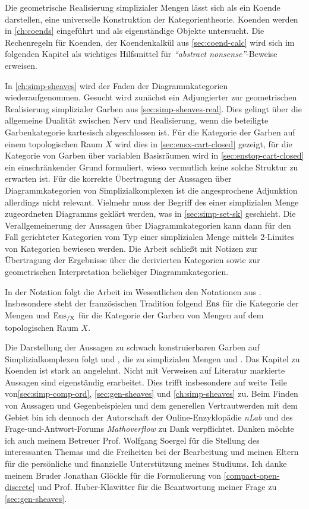 Die geometrische Realisierung simplizialer Mengen lässt sich als ein
Koende darstellen, eine universelle Konstruktion der
Kategorientheorie. Koenden werden in \autoref{ch:coends} eingeführt
und als eigenständige Objekte untersucht. Die Rechenregeln für
Koenden, der Koendenkalkül aus \autoref{sec:coend-calc} wird sich im
folgenden Kapitel als wichtiges Hilfsmittel für \emph{``abstract
  nonsense''}-Beweise erweisen.

In \autoref{ch:simp-sheaves} wird der Faden der Diagrammkategorien
wiederaufgenommen. Gesucht wird zunächst ein Adjungierter zur
geometrischen Realisierung simplizialer Garben aus
\autoref{sec:simp-sheaves-real}. Dies gelingt über die allgemeine
Dualität zwischen Nerv und Realisierung, wenn die beteiligte
Garbenkategorie kartesisch abgeschlossen ist.  Für die Kategorie der
Garben auf einem topologischen Raum $X$ wird dies in
\autoref{sec:ensx-cart-closed} gezeigt, für die Kategorie von Garben
über variablen Basisräumen wird in \autoref{sec:enstop-cart-closed}
ein einschränkender Grund formuliert, wieso vermutlich keine solche
Struktur zu erwarten ist. Für die korrekte Übertragung der Aussagen
über Diagrammkategorien von Simplizialkomplexen ist die angesprochene
Adjunktion allerdings nicht relevant. Vielmehr muss der Begriff des
einer simplizialen Menge zugeordneten Diagramms geklärt werden, was in
\autoref{sec:simp-set-sk} geschieht. Die Verallgemeinerung der
Aussagen über Diagrammkategorien kann dann für den Fall gerichteter
Kategorien vom Typ einer simplizialen Menge mittels 2-Limites von
Kategorien bewiesen werden. Die Arbeit schließt mit Notizen zur
Übertragung der Ergebnisse über die derivierten Kategorien sowie zur
geometrischen Interpretation beliebiger Diagrammkategorien.

In der Notation folgt die Arbeit im Wesentlichen den Notationen aus
\cite{TG}. Insbesondere steht der französischen Tradition folgend
$\operatorname{Ens}$ für die Kategorie der Mengen und $\operatorname{Ens_{/X}}$ für die Kategorie der
Garben von Mengen auf dem topologischen Raum $X$.

Die Darstellung der Aussagen zu schwach konstruierbaren Garben auf
Simplizialkomplexen folgt \cite{KS} und \cite{WS}, die zu simplizialen
Mengen \cite{GJ} und \cite{GM}. Das Kapitel zu Koenden ist stark an
\cite{Lore} angelehnt. Nicht mit Verweisen auf Literatur markierte
Aussagen sind eigenständig erarbeitet. Dies trifft insbesondere auf
weite Teile von\autoref{sec:simp-comp-ord}, \autoref{sec:gen-sheaves}
und \autoref{ch:simp-sheaves} zu. Beim Finden von Aussagen und
Gegenbeispielen und dem generellen Vertrautwerden mit dem Gebiet bin
ich dennoch der Autorschaft der Online-Enzyklopädie \emph{nLab} und
des Frage-und-Antwort-Forums \emph{Mathoverflow} zu Dank
verpflichtet. Danken möchte ich auch meinem Betreuer Prof. Wolfgang
Soergel für die Stellung des interessanten Themas und die Freiheiten
bei der Bearbeitung und meinen Eltern für die persönliche und
finanzielle Unterstützung meines Studiums. Ich danke meinem Bruder
Jonathan Glöckle für die Formulierung von \ref{compact-open-discrete}
und Prof. Huber-Klawitter für die Beantwortung meiner Frage zu
\autoref{sec:gen-sheaves}.
